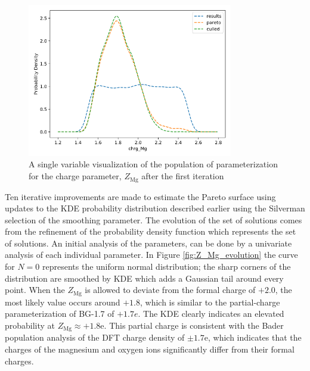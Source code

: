 \begin{figure}[ht]
	\centering
  \includegraphics[width=0.8\textwidth]{chapter7/Z_Mg_iter_0_pareto}
  \caption{A single variable visualization of the population of parameterization for the charge parameter, $Z_{\text{Mg}}$ after the first iteration}
  \label{fig:Z_Mg_iter_0_pareto}
\end{figure}

Ten iterative improvements are made to estimate the Pareto surface using updates to the KDE probability distribution described earlier using the Silverman selection of the smoothing parameter. The evolution of the set of solutions comes from the refinement of the probability density function which represents the set of solutions.  An initial analysis of the parameters, can be done by a univariate analysis of each individual parameter. In Figure \ref{fig:Z_Mg_evolution} the curve for  $N=0$ represents the uniform normal distribution; the sharp corners of the distribution are smoothed by KDE which adds a Gaussian tail around every point.  When the $Z_{\text{Mg}}$  is allowed to deviate from the formal charge of $+2.0$, the most likely value occurs around $+1.8$, which is similar to the partial-charge parameterization of BG-1.7 of $+1.7 e$.  The KDE clearly indicates an elevated probability at $Z_{\text{Mg}} \approx +1.8 \text{e}$.  This partial charge is consistent with the Bader population analysis of the DFT charge density of $±1.7$e\cite{henkelman2005_buckingham_MgO}, which indicates that the charges of the magnesium and oxygen ions significantly differ from their formal charges.

